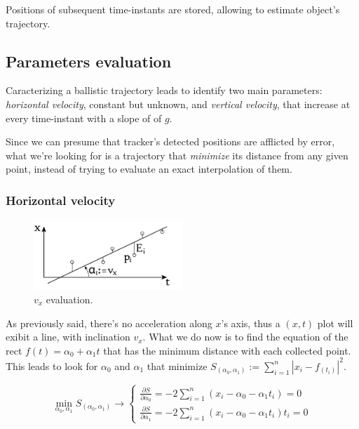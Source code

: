 \documentclass[notitlepage,a4paper,11pt]{article} %
\begin{document}
		Positions of subsequent time-instants are stored, allowing to estimate object's trajectory.

	\subsection{Parameters evaluation}

		Caracterizing a ballistic trajectory leads to identify two main parameters: \emph{horizontal velocity}, constant but unknown, and \emph{vertical velocity}, that increase at every time-instant with a slope of of $g$.

		Since we can presume that tracker's detected positions are afflicted by error, what we're looking for is a trajectory that \emph{minimize} its distance from any given point, instead of trying to evaluate an exact interpolation of them.

		\subsubsection{Horizontal velocity}

		\begin{figure}[htb]
		\centering \includegraphics[width=0.5\textwidth]{vx}
			\caption{$v_x$ evaluation.}
		\end{figure}

			As previously said, there's no acceleration along $x$'s axis, thus a $(x,t)$ plot will exibit a line, with inclination $v_x$.
			What we do now is to find the equation of the rect $f(t) = \alpha_0 + \alpha_1 t$ that has the minimum distance with each collected point.
			This leads to look for $\alpha_0$ and $\alpha_1$ that minimize $ S_{(\alpha_0, \alpha_1)} := \sum_{i=1}^n | x_i - f_{(t_i)} |^2 $.

			\begin{equation}
				\min_{\alpha_0, \alpha_1} S_{(\alpha_0, \alpha_1)} \to
				\begin{cases}
					\frac{\partial S}{\partial \alpha_0} = -2 \sum_{i=1}^n (x_i - \alpha_0 - \alpha_1 t_i) = 0 \\
					\frac{\partial S}{\partial \alpha_1} = -2 \sum_{i=1}^n (x_i - \alpha_0 - \alpha_1 t_i) t_i = 0
				\end{cases}
			\end{equation}
\end{document}
